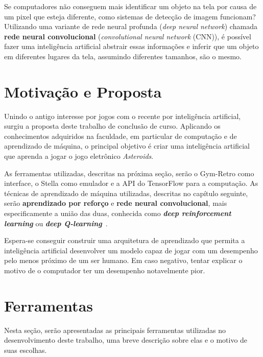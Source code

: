 Se computadores não conseguem mais identificar um objeto na tela por causa de um pixel que esteja diferente, como sistemas de detecção de imagem funcionam?
Utilizando uma variante de rede neural profunda (\textit{deep neural network}) chamada \textbf{rede neural convolucional} (\textit{convolutional neural network} (CNN)), é possível fazer uma inteligência artificial abstrair essas informações e inferir que um objeto em diferentes lugares da tela, assumindo diferentes tamanhos, são o mesmo.

\section{Motivação e Proposta}
\label{sec:motivacao_proposta}

Unindo o antigo interesse por jogos com o recente por inteligência artificial, surgiu a proposta deste trabalho de conclusão de curso.
Aplicando os conhecimentos adquiridos na faculdade, em particular de computação e de aprendizado de máquina, o principal objetivo é criar uma inteligência artificial que aprenda a jogar o jogo eletrônico \textit{Asteroids}.

As ferramentas utilizadas, descritas na próxima seção, serão o Gym-Retro como interface, o Stella como emulador e a API do TensorFlow para a computação.
As técnicas de aprendizado de máquina utilizadas, descritas no capítulo seguinte, serão \textbf{aprendizado por reforço} e \textbf{rede neural convolucional}, mais especificamente a união das duas, conhecida como \textit{\textbf{deep reinforcement learning}} ou \textit{\textbf{deep Q-learning}}~\cite{DBLP:journals/corr/MnihKSGAWR13}.

Espera-se conseguir construir uma arquitetura de aprendizado que permita a inteligência artificial desenvolver um modelo capaz de jogar com um desempenho pelo menos próximo de um ser humano.
Em caso negativo, tentar explicar o motivo de o computador ter um desempenho notavelmente pior.

\section{Ferramentas}
\label{sec:tools}
Nesta seção, serão apresentadas as principais ferramentas utilizadas no desenvolvimento deste trabalho, uma breve descrição sobre elas e o motivo de suas escolhas.

